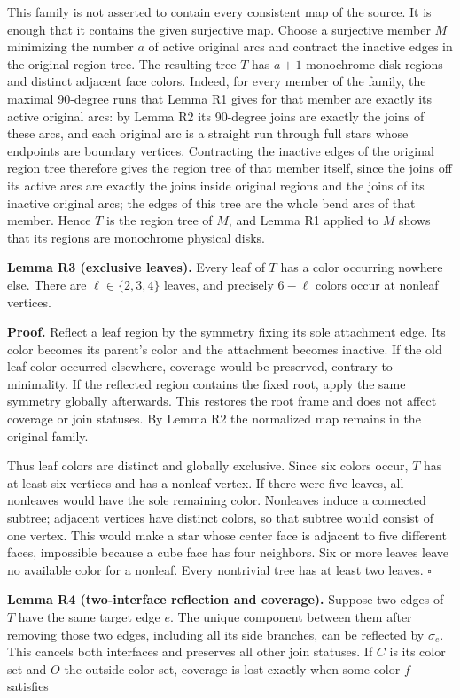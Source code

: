 \documentclass[
  11pt,
]{article}
\begin{document}
This family is not asserted to contain every consistent map of the
source. It is enough that it contains the given surjective map. Choose a
surjective member \(M\) minimizing the number \(a\) of active original
arcs and contract the inactive edges in the original region tree. The
resulting tree \(T\) has \(a+1\) monochrome disk regions and distinct
adjacent face colors. Indeed, for every member of the family, the
maximal 90-degree runs that Lemma R1 gives for that member are exactly
its active original arcs: by Lemma R2 its 90-degree joins are exactly
the joins of these arcs, and each original arc is a straight run through
full stars whose endpoints are boundary vertices. Contracting the
inactive edges of the original region tree therefore gives the region
tree of that member itself, since the joins off its active arcs are
exactly the joins inside original regions and the joins of its inactive
original arcs; the edges of this tree are the whole bend arcs of that
member. Hence \(T\) is the region tree of \(M\), and Lemma R1 applied to
\(M\) shows that its regions are monochrome physical disks.

\textbf{Lemma R3 (exclusive leaves).} Every leaf of \(T\) has a color
occurring nowhere else. There are \(\ell\in\{2,3,4\}\) leaves, and
precisely \(6-\ell\) colors occur at nonleaf vertices.

\textbf{Proof.} Reflect a leaf region by the symmetry fixing its sole
attachment edge. Its color becomes its parent's color and the attachment
becomes inactive. If the old leaf color occurred elsewhere, coverage
would be preserved, contrary to minimality. If the reflected region
contains the fixed root, apply the same symmetry globally afterwards.
This restores the root frame and does not affect coverage or join
statuses. By Lemma R2 the normalized map remains in the original family.

Thus leaf colors are distinct and globally exclusive. Since six colors
occur, \(T\) has at least six vertices and has a nonleaf vertex. If
there were five leaves, all nonleaves would have the sole remaining
color. Nonleaves induce a connected subtree; adjacent vertices have
distinct colors, so that subtree would consist of one vertex. This would
make a star whose center face is adjacent to five different faces,
impossible because a cube face has four neighbors. Six or more leaves
leave no available color for a nonleaf. Every nontrivial tree has at
least two leaves. \(\square\)

\textbf{Lemma R4 (two-interface reflection and coverage).} Suppose two
edges of \(T\) have the same target edge \(e\). The unique component
between them after removing those two edges, including all its side
branches, can be reflected by \(\sigma_e\). This cancels both interfaces
and preserves all other join statuses. If \(C\) is its color set and
\(O\) the outside color set, coverage is lost exactly when some color
\(f\) satisfies
\end{document}
